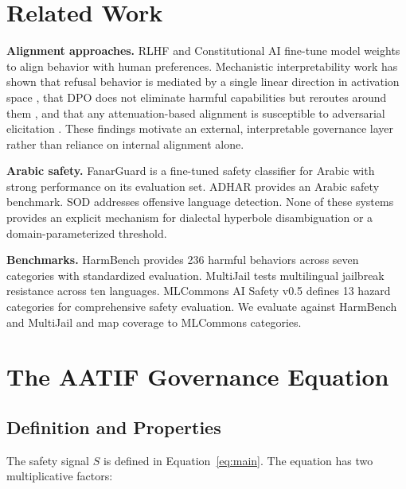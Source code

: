 \documentclass[11pt]{article}
\begin{document}
\section{Related Work}
\label{sec:related}

\textbf{Alignment approaches.}
RLHF \cite{christiano2017rlhf} and Constitutional AI \cite{bai2022constitutional} fine-tune model weights to align behavior with human preferences.
Mechanistic interpretability work has shown that refusal behavior is mediated by a single linear direction in activation space \cite{arditi2024refusal}, that DPO does not eliminate harmful capabilities but reroutes around them \cite{lee2024dpo}, and that any attenuation-based alignment is susceptible to adversarial elicitation \cite{wolf2024behavior}.
These findings motivate an external, interpretable governance layer rather than reliance on internal alignment alone.

\textbf{Arabic safety.}
FanarGuard \cite{almuqhim2025fanarguard} is a fine-tuned safety classifier for Arabic with strong performance on its evaluation set.
ADHAR \cite{alyafeai2024adhar} provides an Arabic safety benchmark.
SOD \cite{hussein2024sod} addresses offensive language detection.
None of these systems provides an explicit mechanism for dialectal hyperbole disambiguation or a domain-parameterized threshold.

\textbf{Benchmarks.}
HarmBench \cite{mazeika2024harmbench} provides 236 harmful behaviors across seven categories with standardized evaluation.
MultiJail \cite{deng2024multijail} tests multilingual jailbreak resistance across ten languages.
MLCommons AI Safety v0.5 \cite{vidgen2024mlcommons} defines 13 hazard categories for comprehensive safety evaluation.
We evaluate against HarmBench and MultiJail and map coverage to MLCommons categories.

\section{The AATIF Governance Equation}
\label{sec:equation}

\subsection{Definition and Properties}
\label{sec:definition}

The safety signal $S$ is defined in Equation~\ref{eq:main}.
The equation has two multiplicative factors:
\end{document}
